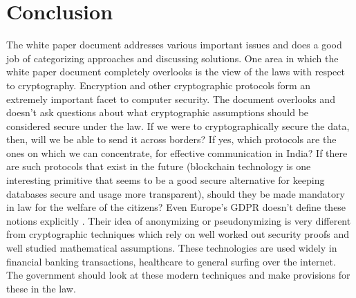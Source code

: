 \section{Conclusion}
\par
The white paper document addresses various important issues and does a good job of categorizing approaches and discussing solutions. One area in which the white paper document completely overlooks is the view of the laws with respect to cryptography. Encryption and other cryptographic protocols form an extremely important facet to computer security. The document overlooks and doesn't ask questions about what cryptographic assumptions should be considered secure under the law. If we were to cryptographically secure the data, then, will we be able to send it across borders? If yes, which protocols are the ones on which we can concentrate, for effective communication in India? If there are such protocols that exist in the future (blockchain technology is one interesting primitive that seems to be a good secure alternative for keeping databases secure and usage more transparent), should they be made mandatory in law for the welfare of the citizens? Even Europe's GDPR doesn't define these notions explicitly \cite{secproto}. Their idea of anonymizing or pseudonymizing is very different from cryptographic techniques which rely on well worked out security proofs and well studied mathematical assumptions. These technologies are used widely in financial banking transactions, healthcare to general surfing over the internet. The government should look at these modern techniques and make provisions for these in the law.